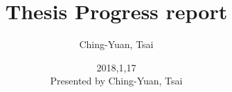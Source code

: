 \documentclass{beamer}
\title{Thesis Progress report}
\author{
    Ching-Yuan, Tsai
}
\date{
    \tiny{2018,1,17}\\
    \tiny{Presented by Ching-Yuan, Tsai}
}
\begin{document}
\begin{frame}
    \titlepage
\end{frame}





\end{document}
